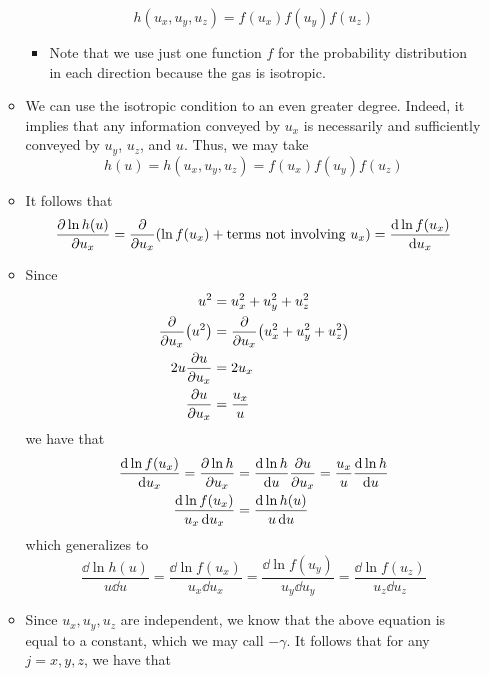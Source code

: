 \documentclass[../notes.tex]{subfiles}
\begin{document}
\begin{itemize}
\begin{itemize}
        \begin{equation*}
            h(u_x,u_y,u_z) = f(u_x)f(u_y)f(u_z)
        \end{equation*}
        \begin{itemize}
            \item Note that we use just one function $f$ for the probability distribution in each direction because the gas is isotropic.
        \end{itemize}
        \item We can use the isotropic condition to an even greater degree. Indeed, it implies that any information conveyed by $u_x$ is necessarily and sufficiently conveyed by $u_y$, $u_z$, and $u$. Thus, we may take
        \begin{equation*}
            h(u) = h(u_x,u_y,u_z) = f(u_x)f(u_y)f(u_z)
        \end{equation*}
        \item It follows that
        \begin{equation*}
            \pdv{\ln h(u)}{u_x} = \pdv{u_x}(\ln f(u_x)+\text{terms not involving }u_x)
            = \dv{\ln f(u_x)}{u_x}
        \end{equation*}
        \item Since
        \begin{align*}
            u^2 &= u_x^2+u_y^2+u_z^2\\
            \pdv{u_x}(u^2) &= \pdv{u_x}(u_x^2+u_y^2+u_z^2)\\
            2u\pdv{u}{u_x} &= 2u_x\\
            \pdv{u}{u_x} &= \frac{u_x}{u}
        \end{align*}
        we have that
        \begin{align*}
            \frac{\dd\ln f(u_x)}{\dd{u_x}} = \pdv{\ln h}{u_x} &= \dv{\ln h}{u}\pdv{u}{u_x} = \frac{u_x}{u}\dv{\ln h}{u}\\
            \frac{\dd{\ln f(u_x)}}{u_x\dd{u_x}} &= \frac{\dd{\ln h(u)}}{u\dd{u}}
        \end{align*}
        which generalizes to
        \begin{equation*}
            \frac{\dd{\ln h(u)}}{u\dd{u}} = \frac{\dd{\ln f(u_x)}}{u_x\dd{u_x}}
            = \frac{\dd{\ln f(u_y)}}{u_y\dd{u_y}}
            = \frac{\dd{\ln f(u_z)}}{u_z\dd{u_z}}
        \end{equation*}
        \item Since $u_x,u_y,u_z$ are independent, we know that the above equation is equal to a constant, which we may call $-\gamma$. It follows that for any $j=x,y,z$, we have that

\end{itemize}
\end{itemize}
\end{document}
